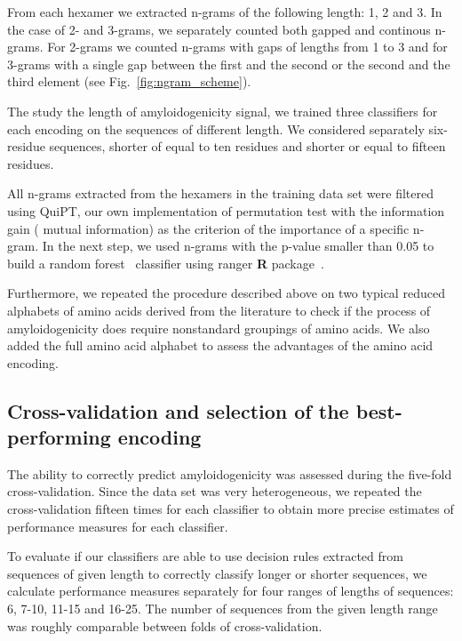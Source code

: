 \documentclass{bioinfo}
\begin{document}
\begin{methods}
  From each hexamer we extracted n-grams of the following length: 1, 2 and 3. In 
the case of 2- and 3-grams, we separately counted both gapped and continous 
n-grams. For 2-grams we counted n-grams with gaps of lengths from 1 to 3 and for 
3-grams with a single gap between the first and the second or the second and the 
third element (see Fig.~\ref{fig:ngram_scheme}).

  The study the length of amyloidogenicity signal, we trained three 
classifiers for each encoding on the sequences of different length. We 
considered separately six-residue sequences, shorter of equal to ten residues 
and shorter or equal to fifteen residues.

  All n-grams extracted from the hexamers in the training data set were filtered 
using QuiPT, our own implementation of permutation test with the information 
gain ( mutual information) as the criterion of the importance of a specific 
n-gram. In the next step, we used n-grams with the p-value smaller than 0.05 to 
build a random forest~\citep{breiman_random_2001} classifier using ranger 
\textbf{R} package~\citep{wright_ranger:_2015}. 

  Furthermore, we repeated the procedure described above on two typical reduced 
alphabets of amino acids derived from the literature to check if the process of 
amyloidogenicity does require nonstandard groupings of amino acids. We also 
added the full amino acid alphabet to assess the advantages of the amino acid 
encoding.

\subsection{Cross-validation and selection of the best-performing encoding}

The ability to correctly predict amyloidogenicity was assessed during the 
five-fold cross-validation. Since the data set was very heterogeneous, we 
repeated the cross-validation fifteen times for each classifier to obtain more 
precise estimates of performance measures for each classifier. 

  To evaluate if our classifiers are able to use decision rules extracted from 
sequences of given length to correctly classify longer or shorter sequences, we 
calculate performance measures separately for four ranges of lengths of 
sequences: 6, 7-10, 11-15 and 16-25. The number of sequences from the given 
length range was roughly comparable between folds of cross-validation.
  

\end{methods}
\end{document}
